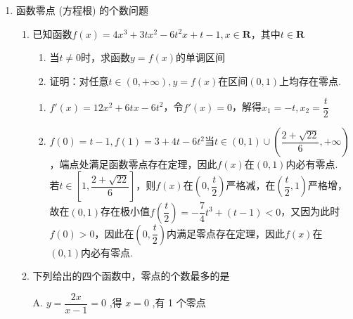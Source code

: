 \begin{enumerate}
    \item 函数零点 (方程根) 的个数问题
    \begin{enumerate}
        \item 已知函数$f(x) = 4x^3+3tx^2-6t^2x+t-1, x \in \mathbf{R}$，其中$t \in \mathbf{R}$
        \begin{enumerate}
            \item 当$t \neq 0$时，求函数$y = f(x)$的单调区间
            \item 证明：对任意$t \in (0, +\infty), y = f(x)$在区间$(0, 1)$上均存在零点.
        \end{enumerate}
        \begin{jieda}
            \begin{enumerate}
                \item $f'(x) = 12x^2+6tx - 6t^2$，令$f'(x) = 0$，解得$x_1 = -t, x_2 = \dfrac{t}{2}$
                \item $f(0) = t-1, f(1) = 3+4t-6t^2$当$t \in (0, 1) \cup \left(\dfrac{2+\sqrt{22}}{6}, +\infty \right)$，端点处满足函数零点存在定理，因此$f(x)$在$(0, 1)$内必有零点. \\
                若$t \in \left[1, \dfrac{2+\sqrt{22}}{6}\right]$，则$f(x)$在$\left(0, \dfrac{t}{2}\right)$严格减，在$\left(\dfrac{t}{2}, 1\right)$严格增，故在$(0, 1)$存在极小值$f\left(\dfrac{t}{2}\right) = -\dfrac{7}{4}t^3+(t-1) < 0$，又因为此时$f(0) > 0$，因此在$\left(0, \dfrac{t}{2}\right)$内满足零点存在定理，因此$f(x)$在$(0, 1)$内必有零点.
            \end{enumerate}
        \end{jieda}
        \item 下列给出的四个函数中，零点的个数最多的是

        \begin{jieda}
            A. $y = \dfrac{2x}{x - 1} = 0$ ,得 $x = 0$ ,有 1 个零点
            

\end{jieda}
\end{enumerate}
\end{enumerate}
